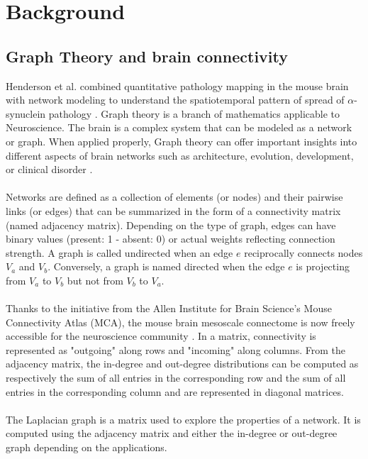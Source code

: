 \section{Background}
\subsection{Graph Theory and brain connectivity}
Henderson et al. combined quantitative pathology mapping in the mouse brain with network modeling to understand the spatiotemporal pattern of spread of  $\alpha$-synuclein pathology \cite{Henderson_2019}. Graph theory is a branch of mathematics applicable to Neuroscience. The brain is a complex system that can be modeled as a network or graph. When applied properly, Graph theory can offer important insights into different aspects of brain networks such as architecture, evolution, development, or clinical disorder \cite{Sporns_2018}.\\
\\
Networks are defined as a collection of elements (or nodes) and their pairwise links (or edges) that can be summarized in the form of a connectivity matrix (named adjacency matrix). Depending on the type of graph, edges can have binary values (present: 1 - absent: 0) or actual weights reflecting connection strength. A graph is called undirected when an edge $e$ reciprocally connects nodes $V_{a}$ and $V_{b}$. Conversely, a graph is named directed when the edge $e$ is projecting from $V_{a}$ to $V_{b}$ but not from $V_{b}$ to $V_{a}$.\\
\\
Thanks to the initiative from the Allen Institute for Brain Science's Mouse Connectivity Atlas (MCA), the mouse brain mesoscale connectome is now freely accessible for the neuroscience community \cite{Oh_2014}. In a matrix, connectivity is represented as "outgoing" along  rows and "incoming" along  columns. From the adjacency matrix, the in-degree and out-degree distributions can be computed as respectively the sum of all entries in the corresponding row and the sum of all entries in the corresponding column and are represented in diagonal matrices.\\
\\
The Laplacian graph is a matrix used to explore the properties of a network. It is computed using the adjacency matrix and either the in-degree or out-degree graph depending on the applications.


